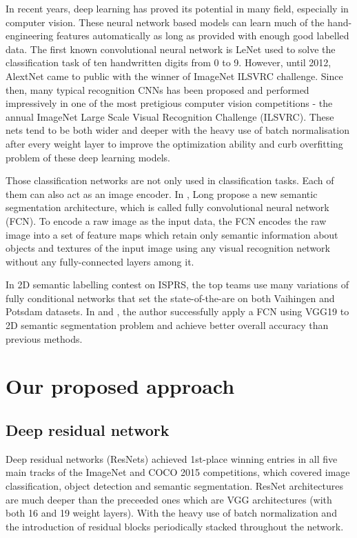 \documentclass[conference]{IEEEtran}
\begin{document}
In recent years, deep learning has proved its potential in many field,
especially in computer vision. These neural network based models can learn
much of the hand-engineering features automatically as long as provided with
enough good labelled data. The first known convolutional neural network is
LeNet used to solve the classification task of ten handwritten digits from 0 to
9. However, until 2012, AlextNet came to public with the winner of ImageNet
ILSVRC challenge. Since then, many typical recognition CNNs has been proposed
and performed impressively in one of the most pretigious computer vision
competitions - the annual ImageNet Large Scale Visual Recognition Challenge
(ILSVRC). These nets tend to be both wider and deeper with the heavy use of
batch normalisation after every weight layer to improve the optimization ability
and curb overfitting problem of these deep learning models.

Those classification networks are not only used in classification tasks. Each
of them can also act as an image encoder. In \cite{long2015fully}, Long propose
a new semantic segmentation architecture, which is called fully convolutional
neural network (FCN). To encode a raw image as the input data, the FCN encodes
the raw image into a set of feature maps which retain only semantic information
about objects and textures of the input image using any visual recognition
network without any fully-connected layers among it.

In 2D semantic labelling contest on ISPRS, the top teams use many variations of
fully conditional networks that set the state-of-the-are on both Vaihingen and
Potsdam datasets. In \cite{duydensenet} and \cite{duyvgg19}, the author
successfully apply a FCN using VGG19 to 2D semantic segmentation problem and
achieve better overall accuracy than previous methods.

\section{Our proposed approach}
\subsection{Deep residual network}

Deep residual networks (ResNets) \cite{he2016deep} achieved
1st-place winning entries in all five main tracks of the ImageNet and COCO 2015
competitions, which covered image classification, object detection and semantic
segmentation. ResNet architectures are much deeper than the preceeded ones which
are VGG architectures (with both 16 and 19 weight layers). With the heavy use of
batch normalization and the introduction of residual blocks periodically stacked
throughout the network.
\end{document}
